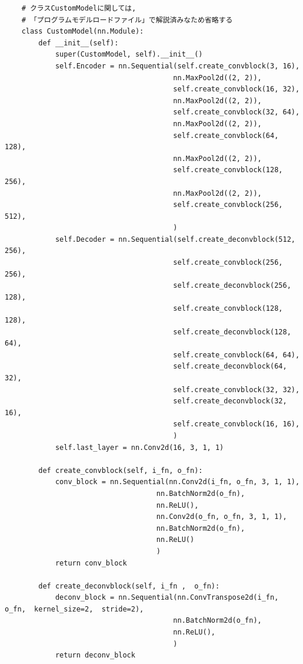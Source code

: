 \documentclass[dvipdfmx]{jsarticle}
\begin{document}
\begin{lstlisting}
    # クラスCustomModelに関しては, 
    # 「プログラムモデルロードファイル」で解説済みなため省略する
    class CustomModel(nn.Module):
        def __init__(self):
            super(CustomModel, self).__init__() 
            self.Encoder = nn.Sequential(self.create_convblock(3, 16), 
                                        nn.MaxPool2d((2, 2)), 
                                        self.create_convblock(16, 32), 
                                        nn.MaxPool2d((2, 2)), 
                                        self.create_convblock(32, 64), 
                                        nn.MaxPool2d((2, 2)), 
                                        self.create_convblock(64, 128), 
                                        nn.MaxPool2d((2, 2)), 
                                        self.create_convblock(128, 256), 
                                        nn.MaxPool2d((2, 2)), 
                                        self.create_convblock(256, 512), 
                                        )
            self.Decoder = nn.Sequential(self.create_deconvblock(512, 256), 
                                        self.create_convblock(256, 256), 
                                        self.create_deconvblock(256, 128), 
                                        self.create_convblock(128, 128), 
                                        self.create_deconvblock(128, 64), 
                                        self.create_convblock(64, 64), 
                                        self.create_deconvblock(64, 32), 
                                        self.create_convblock(32, 32), 
                                        self.create_deconvblock(32, 16), 
                                        self.create_convblock(16, 16), 
                                        )
            self.last_layer = nn.Conv2d(16, 3, 1, 1)
                                                   
        def create_convblock(self, i_fn, o_fn):
            conv_block = nn.Sequential(nn.Conv2d(i_fn, o_fn, 3, 1, 1), 
                                    nn.BatchNorm2d(o_fn), 
                                    nn.ReLU(), 
                                    nn.Conv2d(o_fn, o_fn, 3, 1, 1), 
                                    nn.BatchNorm2d(o_fn), 
                                    nn.ReLU()
                                    )
            return conv_block

        def create_deconvblock(self, i_fn ,  o_fn):
            deconv_block = nn.Sequential(nn.ConvTranspose2d(i_fn,  o_fn,  kernel_size=2,  stride=2), 
                                        nn.BatchNorm2d(o_fn), 
                                        nn.ReLU(), 
                                        )
            return deconv_block
   

\end{lstlisting}
\end{document}
